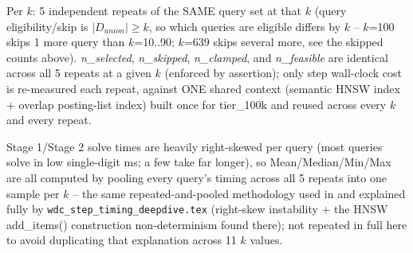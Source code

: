 \begin{minipage}{\linewidth}
\footnotesize
\begin{tablenotes}
\item[a] Per $k$: 5 independent repeats of the SAME query set at that $k$ (query eligibility/skip is $|D_{union}|\geq k$, so which queries are eligible differs by $k$ -- $k$=100 skips 1 more query than $k$=10..90; $k$=639 skips several more, see the skipped counts above). \emph{n\_selected}, \emph{n\_skipped}, \emph{n\_clamped}, and \emph{n\_feasible} are identical across all 5 repeats at a given $k$ (enforced by assertion); only step wall-clock cost is re-measured each repeat, against ONE shared context (semantic HNSW index + overlap posting-list index) built once for tier\_100k and reused across every $k$ and every repeat.
\item[b] Stage 1/Stage 2 solve times are heavily right-skewed per query (most queries solve in low single-digit ms; a few take far longer), so Mean/Median/Min/Max are all computed by pooling every query's timing across all 5 repeats into one sample per $k$ -- the same repeated-and-pooled methodology used in and explained fully by \texttt{wdc\_step\_timing\_deepdive.tex} (right-skew instability + the HNSW add\_items() construction non-determinism found there); not repeated in full here to avoid duplicating that explanation across 11 $k$ values.
\end{tablenotes}
\end{minipage}
